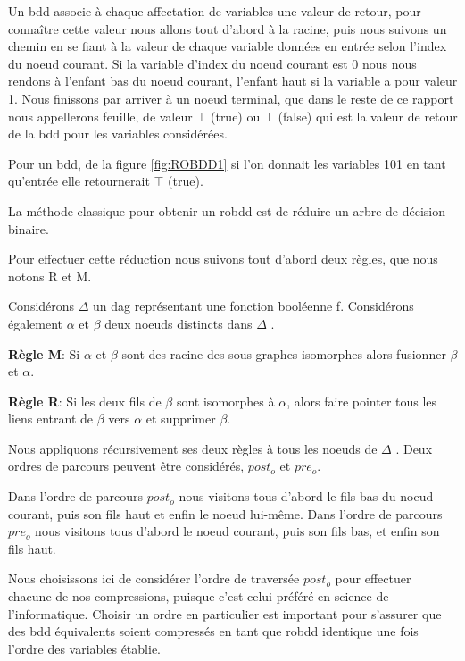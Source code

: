 \documentclass[french]{article}
\begin{document}
Un bdd associe à chaque affectation de variables une valeur de retour, pour connaître cette valeur nous allons tout d'abord à la racine, puis nous suivons un chemin en se fiant à la valeur de chaque variable données en entrée selon l'index du noeud courant. Si la variable d'index du noeud courant est 0 nous nous rendons à l'enfant bas du noeud courant, l'enfant haut si la variable a pour valeur 1. Nous finissons par arriver à un noeud terminal, que dans le reste de ce rapport nous appellerons feuille, de valeur \(\top\) (true) ou \(\bot\) (false) qui est la valeur de retour de la bdd pour les variables considérées.

Pour un bdd, de la figure \ref{fig:ROBDD1} si l'on donnait les variables 101 en tant qu'entrée elle retournerait \(\top\) (true). 

La méthode classique pour obtenir un robdd est de réduire un arbre de décision binaire. 

Pour effectuer cette réduction nous suivons tout d'abord deux règles, que nous notons R et M.
\vspace{5mm} 

Considérons \(\Delta\) un dag représentant une fonction booléenne f. Considérons également \(\alpha\) et \(\beta\)  deux noeuds distincts dans \(\Delta\) .

\textbf{Règle M}: Si \(\alpha\) et \(\beta\) sont des racine des sous graphes isomorphes alors fusionner \(\beta\) et \(\alpha\).

\textbf{Règle R}: Si les deux fils de \(\beta\) sont isomorphes à \(\alpha\), alors faire pointer tous les liens entrant de \(\beta\) vers \(\alpha\) et supprimer \(\beta\).

Nous appliquons récursivement ses deux règles à tous les noeuds de \(\Delta\) .
\vspace{5mm} 
\newpage
Deux ordres de parcours peuvent être considérés, \(post_{o}\) et \(pre_{o}\).

Dans l'ordre de parcours \(post_{o}\) nous visitons tous d'abord le fils bas du noeud courant, puis son fils haut et enfin le noeud lui-même.
Dans l'ordre de parcours \(pre_{o}\) nous visitons tous d'abord le noeud courant, puis son fils bas, et enfin son fils haut.

Nous choisissons ici de considérer l'ordre de traversée \(post_{o}\) pour effectuer chacune de nos compressions, puisque c'est celui préféré en science de l'informatique. Choisir un ordre en particulier est important pour s'assurer que des bdd équivalents soient compressés en tant que robdd identique une fois l'ordre des variables établie.
\vspace{5mm} 
\end{document}
